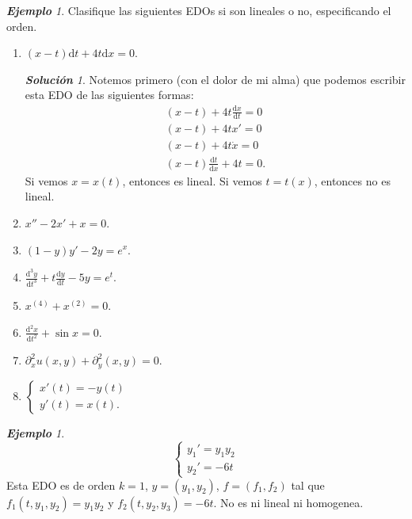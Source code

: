 \documentclass{article}
\theoremstyle{definition}
\theoremstyle{remark}
\newtheorem*{solution}{\textbf{Solución}}
\newtheorem{example}[theorem]{\textbf{Ejemplo}}
\numberwithin{equation}{section}
\renewcommand{\d}{\mathrm{d}}
\newcommand{\del}{\partial}
\newcommand{\dv}[2]{\frac{\d#1}{\d#2}}
\begin{document}
\begin{example}
    Clasifique las siguientes EDOs si son lineales o no, especificando el orden.
    \begin{enumerate}
        \item $(x-t) \d t + 4t \d x = 0$.
        \begin{solution}
            Notemos primero (con el dolor de mi alma) que podemos escribir esta EDO de las siguientes formas:
            \begin{align*}
                (x-t) + 4t \dv xt = 0 \\
                (x-t) + 4t x' = 0 \\
                (x-t) + 4t \dot x = 0 \\
                (x-t) \dv tx + 4t = 0.
            \end{align*}
            Si vemos $x = x(t)$, entonces es lineal. Si vemos $t = t(x)$, entonces no es lineal.
        \end{solution}
        \item $x'' - 2x' + x = 0$.
        \item $(1 - y) y' - 2y = e^x$.
        \item $\dv{^3 y}{t^3} + t \dv yt - 5y = e^t$.
        \item $x^{(4)} + x^{(2)} = 0$.
        \item $\dv{^2 x}{t^2} + \sin x = 0$.
        \item $\del_x^2 u(x,y) + \del_y^2(x,y) = 0$.
        \item $\begin{cases}
            x'(t) = -y(t) \\ y'(t) = x(t).
        \end{cases}$
    \end{enumerate}
\end{example}

\begin{example}
    $$\begin{cases}
        y_1' = y_1 y_2 \\ y_2' = -6t
    \end{cases}$$ Esta EDO es de orden $k = 1$, $y = (y_1, y_2)$, $f = (f_1, f_2)$ tal que $f_1(t,y_1,y_2) = y_1 y_2$ y $f_2(t,y_2,y_3) = -6t$. No es ni lineal ni homogenea.
\end{example}
\end{document}
